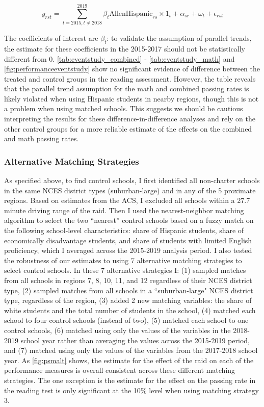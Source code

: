 \documentclass[hidelinks,twoside]{article}
\begin{document}
\begin{equation*}
    y_{rst} = \sum_{t=2015,t\neq2018}^{2019} \beta_{t} \text{AllenHispanic}_{rs} \times 1_t + \alpha_{sr} + \omega_{t} + \epsilon_{rst}
\end{equation*}

The coefficients of interest are $\beta_{t}$: to validate the assumption of parallel trends, the estimate for these coefficients in the 2015-2017 should not be statistically different from 0. \autoref{tab:eventstudy_combined} - \autoref{tab:eventstudy_math} and \autoref{fig:performanceeventstudy} show no significant evidence of difference between the treated and control groups in the reading assessment. However, the table reveals that the parallel trend assumption for the math and combined passing rates is likely violated when using Hispanic students in nearby regions, though this is not a problem when using matched schools. This suggests we should be cautious interpreting the results for these difference-in-difference analyses and rely on the other control groups for a more reliable estimate of the effects on the combined and math passing rates. 

\subsubsection*{Alternative Matching Strategies}

As specified above, to find control schools, I first identified all non-charter schools in the same NCES district types (suburban-large) and in any of the 5 proximate regions. Based on estimates from the ACS, I excluded all schools within a 27.7 minute driving range of the raid. Then I used the nearest-neighbor matching algorithm to select the two ``nearest” control schools based on a fuzzy match on the following school-level characteristics: share of Hispanic students, share of economically disadvantage students, and share of students with limited English proficiency, which I averaged across the 2015-2019 analysis period. I also tested the robustness of our estimates to using 7 alternative matching strategies to select control schools. In these 7 alternative strategies I: (1) sampled matches from all schools in regions 7, 8, 10, 11, and 12 regardless of their NCES district type, (2) sampled matches from all schools in a ``suburban-large" NCES district type, regardless of the region, (3) added 2 new matching variables: the share of white students and the total number of students in the school, (4) matched each school to four control schools (instead of two), (5) matched each school to one control schools, (6) matched using only the values of the variables in the 2018-2019 school year rather than averaging the values across the 2015-2019 period, and (7) matched using only the values of the variables from the 2017-2018 school year. As \autoref{fig:psmalt} shows, the estimate for the effect of the raid on each of the performance measures is overall consistent across these different matching strategies. The one exception is the estimate for the effect on the passing rate in the reading test is only significant at the 10\% level when using matching strategy 3. 
\end{document}

